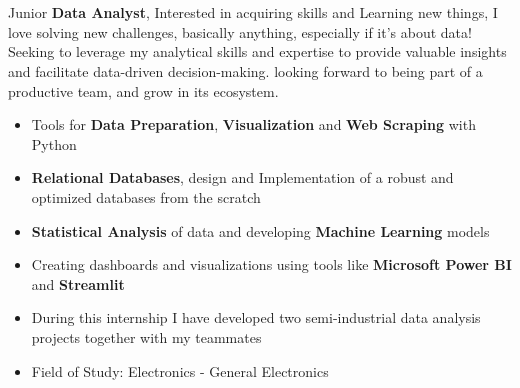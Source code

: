 \documentclass[10pt,a4paper,ragged2e,withhyper]{altacv}
\begin{document}
\begin{paracol}{2}
        
            \\
            \divider

            \\
            \divider



        \switchcolumn
        
            
                {Junior \textbf{Data Analyst}, Interested in acquiring skills and Learning new things, I love solving new challenges, basically anything, especially if it’s about data!
                Seeking to leverage my analytical skills and expertise to provide valuable insights and facilitate data-driven decision-making.
                looking forward to being part of a productive team, and grow in its ecosystem.}

        
            \begin{itemize}
                \item Tools for \textbf{Data Preparation}, \textbf{Visualization} and \textbf{Web Scraping} with Python
                \item \textbf{Relational Databases}, design and Implementation of a robust and optimized databases from the scratch
                \item \textbf{Statistical Analysis} of data and developing \textbf{Machine Learning} models
                \item Creating dashboards and visualizations using tools like \textbf{Microsoft Power BI} and \textbf{Streamlit}
                \item During this internship I have developed two semi-industrial data analysis projects together with my teammates
            \end{itemize}
        
            \begin{itemize}
                \item {Field of Study: Electronics - General Electronics}
            \end{itemize}
            \divider
            

\end{paracol}
\end{document}
